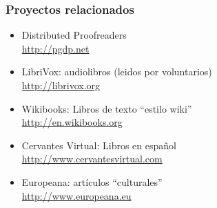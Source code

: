 \begin{frame}
\frametitle{Proyectos relacionados}

{\Large

\begin{itemize}
\item Distributed Proofreaders \\
  \url{http://pgdp.net}
\item LibriVox: audiolibros (leidos por voluntarios) \\
  \url{http://librivox.org}
\item Wikibooks: Libros de texto ``estilo wiki''\\
  \url{http://en.wikibooks.org}
\item Cervantes Virtual: Libros en español \\
  \url{http://www.cervantesvirtual.com}
\item Europeana: artículos ``culturales'' \\
  \url{http://www.europeana.eu}
\end{itemize}

}

\end{frame}


